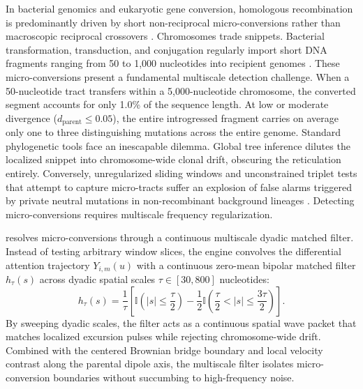 In bacterial genomics and eukaryotic gene conversion, homologous recombination is predominantly driven by short non-reciprocal micro-conversions rather than macroscopic reciprocal crossovers \cite{didelot2010impact,didelot2007inference,didelot2015clonalframeml}.
Chromosomes trade snippets.
Bacterial transformation, transduction, and conjugation regularly import short DNA fragments ranging from 50 to 1,000 nucleotides into recipient genomes \cite{didelot2010impact}.
These micro-conversions present a fundamental multiscale detection challenge.
When a 50-nucleotide tract transfers within a 5,000-nucleotide chromosome, the converted segment accounts for only 1.0\% of the sequence length.
At low or moderate divergence ($d_{\text{parent}} \le 0.05$), the entire introgressed fragment carries on average only one to three distinguishing mutations across the entire genome.
Standard phylogenetic tools face an inescapable dilemma.
Global tree inference dilutes the localized snippet into chromosome-wide clonal drift, obscuring the reticulation entirely.
Conversely, unregularized sliding windows and unconstrained triplet tests that attempt to capture micro-tracts suffer an explosion of false alarms triggered by private neutral mutations in non-recombinant background lineages \cite{boni2007exact}.
Detecting micro-conversions requires multiscale frequency regularization.

\RhizAeon resolves micro-conversions through a continuous multiscale dyadic matched filter.
Instead of testing arbitrary window slices, the engine convolves the differential attention trajectory $Y_{i, m}(u)$ with a continuous zero-mean bipolar matched filter $h_\tau(s)$ across dyadic spatial scales $\tau \in [30, 800]$ nucleotides:
\begin{equation}
h_\tau(s) = \frac{1}{\tau} \left[ \mathbb{I}\left(|s| \le \frac{\tau}{2}\right) - \frac{1}{2} \mathbb{I}\left(\frac{\tau}{2} < |s| \le \frac{3\tau}{2}\right) \right].
\label{eq:results_dyadic_filter}
\end{equation}
By sweeping dyadic scales, the filter acts as a continuous spatial wave packet that matches localized excursion pulses while rejecting chromosome-wide drift.
Combined with the centered Brownian bridge boundary and local velocity contrast along the parental dipole axis, the multiscale filter isolates micro-conversion boundaries without succumbing to high-frequency noise.


